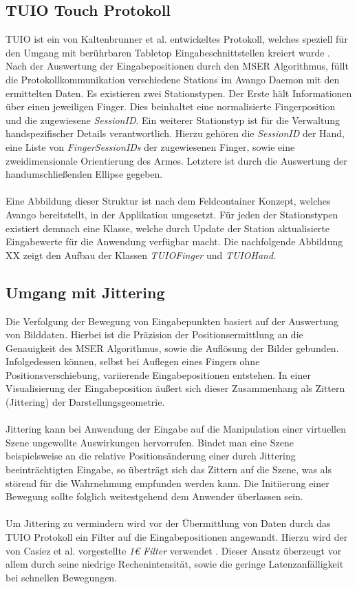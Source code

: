 \subsection{TUIO Touch Protokoll}
\label{subsec:tuio_touch_protokoll}

TUIO ist ein von Kaltenbrunner et al. entwickeltes Protokoll, welches speziell für den Umgang mit berührbaren Tabletop Eingabeschnittstellen kreiert wurde \cite{kaltenbrunner:2005}. Nach der Auswertung der Eingabepositionen durch den MSER Algorithmus, füllt die Protokollkommunikation verschiedene Stations im Avango Daemon mit den ermittelten Daten. Es existieren zwei Stationstypen. Der Erste hält Informationen über einen jeweiligen Finger. Dies beinhaltet eine normalisierte Fingerposition und die zugewiesene \emph{SessionID}. Ein weiterer Stationstyp ist für die Verwaltung handspezifischer Details verantwortlich. Hierzu gehören die \emph{SessionID} der Hand, eine Liste von \emph{FingerSessionIDs} der zugewiesenen Finger, sowie eine zweidimensionale Orientierung des Armes. Letztere ist durch die Auswertung der handumschließenden Ellipse gegeben. 
\\\\
Eine Abbildung dieser Struktur ist nach dem Feldcontainer Konzept, welches Avango bereitstellt, in der Applikation umgesetzt. Für jeden der Stationstypen existiert demnach eine Klasse, welche durch Update der Station aktualisierte Eingabewerte für die Anwendung verfügbar macht. Die nachfolgende Abbildung XX zeigt den Aufbau der Klassen \emph{TUIOFinger} und \emph{TUIOHand}.


\subsection{Umgang mit Jittering}
\label{subsec:umgang_mit_jittering}

Die Verfolgung der Bewegung von Eingabepunkten basiert auf der Auswertung von Bilddaten. Hierbei ist die Präzision der Positionsermittlung an die Genauigkeit des MSER Algorithmus, sowie die Auflösung der Bilder gebunden. Infolgedessen können, selbst bei Auflegen eines Fingers ohne Positionsverschiebung, variierende Eingabepositionen entstehen. In einer Visualisierung der Eingabeposition äußert sich dieser Zusammenhang als Zittern (Jittering) der Darstellungsgeometrie.
\\\\
Jittering kann bei Anwendung der Eingabe auf die Manipulation einer virtuellen Szene ungewollte Auswirkungen hervorrufen. Bindet man eine Szene beispielsweise an die relative Positionsänderung einer durch Jittering beeinträchtigten Eingabe, so überträgt sich das Zittern auf die Szene, was als störend für die Wahrnehmung empfunden werden kann. Die Initiierung einer Bewegung sollte folglich weitestgehend dem Anwender überlassen sein.
\\\\ 
Um Jittering zu vermindern wird vor der Übermittlung von Daten durch das TUIO Protokoll ein Filter auf die Eingabepositionen angewandt. Hierzu wird der von Casiez et al. vorgestellte \emph{1\euro{} Filter} verwendet \cite{casiez:2012}. Dieser Ansatz überzeugt vor allem durch seine niedrige Rechenintensität, sowie die geringe Latenzanfälligkeit bei schnellen Bewegungen.


